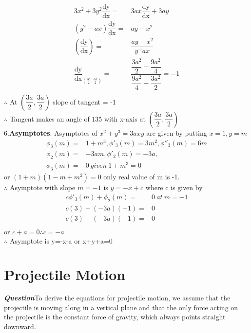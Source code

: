 \documentclass{report}
\begin{document}
		\begin{align*}
			3x^2+3y^2\dfrac{\mathrm{dy}}{\mathrm{dx}}=&3ax\dfrac{\mathrm{dy}}{\mathrm{dx}}+3ay \\
			(y^2-ax)\dfrac{\mathrm{dy}}{\mathrm{dx}}=&ay-x^2 \\
			(\dfrac{\mathrm{dy}}{\mathrm{dx}})=&\dfrac{ay-x^2}{y^-ax} \\
			\dfrac{\mathrm{dy}}{\mathrm{dx}}_{(\frac{3a}{2},\frac{3a}{2})}=&\dfrac{\dfrac{3a^2}{2}-\dfrac{9a^2}{4}}{\dfrac{9a^2}{4}-\dfrac{3a^2}{2}}=-1 \\
		\end{align*}
		\(\therefore\) At \(\left(\dfrac{3a}{2},\dfrac{3a}{2}\right)\) slope of tangent = -1 \\
		\(\therefore\) Tangent makes an angle of 135 with x-axis at \(\left(\dfrac{3a}{2},\dfrac{3a}{2}\right)\) \\
		6.\textbf{Asymptotes}: Asymptotes of \(x^2 + y^3 = 3axy\) are given by putting \(x=1,y=m\) \\
		\begin{align*}
			\phi_3(m)=& 1+m^3 ,\phi'_3(m)=3m^2, \phi''_3(m)=6m \\
			\phi_2(m) =& -3am, \phi'_2(m)=-3a, \\
			\phi_3(m)=& 0\: given\: 1+m^3 = 0 
		\end{align*}
		or \((1+m)(1-m+m^2)=0 \) only real value of m is -1. \\
		\(\therefore\)\: Asymptote with slope \(m=-1\) is \(y=-x+c\) where c is given by \\
		\begin{align*}
			c\phi'_3(m)+\phi_2(m)=&0\: at\: m=-1 \\
			c(3)+(-3a)(-1)=&0 \\
			c(3)+(-3a)(-1)=&0 \\
		\end{align*}
		or $c+a=0 \therefore c=-a$ \\
		$\therefore$ Asymptote is y=-x-a or x+y+a=0 \\

	\chapter{Projectile Motion}
		\textbf{\textit{Question}}To derive the equations for projectile motion, we assume that the projectile is moving along in a vertical plane and that the only force acting on the projectile is the constant force of gravity, which always points straight downward.
\end{document}
